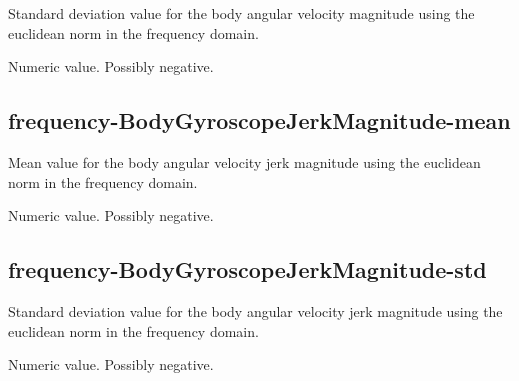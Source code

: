 \documentclass[a4paper,10pt]{report}
\begin{document}
Standard deviation value for the body angular velocity magnitude using the euclidean norm in the frequency domain.

Numeric value. Possibly negative.

\subsection*{frequency-BodyGyroscopeJerkMagnitude-mean} 

Mean value for the body angular velocity jerk magnitude using the euclidean norm in the frequency domain.

Numeric value. Possibly negative.

\subsection*{frequency-BodyGyroscopeJerkMagnitude-std} 

Standard deviation value for the body angular velocity jerk magnitude using the euclidean norm in the frequency domain.

Numeric value. Possibly negative.
\end{document}
